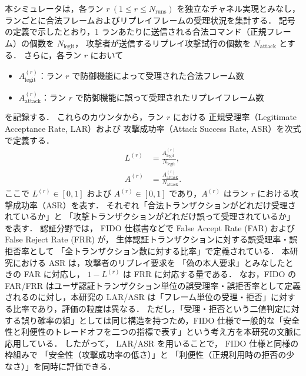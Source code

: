 \documentclass[twocolumn,10pt,a4paper]{jsarticle}
\begin{document}
本シミュレータは，各ラン $r \ (1 \le r \le N_{\mathrm{runs}})$ を独立なチャネル実現とみなし，
ランごとに合法フレームおよびリプレイフレームの受理状況を集計する．
記号の定義で示したとおり，1 ランあたりに送信される合法コマンド（正規フレーム）の個数を
$N_{\mathrm{legit}}$，
攻撃者が送信するリプレイ攻撃試行の個数を
$N_{\mathrm{attack}}$ とする．
さらに，各ラン $r$ において
\begin{itemize}
  \item $A^{(r)}_{\mathrm{legit}}$：ラン $r$ で防御機能によって受理された合法フレーム数
  \item $A^{(r)}_{\mathrm{attack}}$：ラン $r$ で防御機能に誤って受理されたリプレイフレーム数
\end{itemize}
を記録する．
これらのカウンタから，ラン $r$ における
正規受理率（Legitimate Acceptance Rate, LAR）および
攻撃成功率（Attack Success Rate, ASR）を次式で定義する．
\begin{align}
  L^{(r)} &= \frac{A^{(r)}_{\mathrm{legit}}}{N_{\mathrm{legit}}}, \label{eq:def_lar_single_run} \\
  A^{(r)} &= \frac{A^{(r)}_{\mathrm{attack}}}{N_{\mathrm{attack}}}. \label{eq:def_asr_single_run}
\end{align}
ここで $L^{(r)} \in [0,1]$ および $A^{(r)} \in [0,1]$ であり，$A^{(r)}$ はラン $r$ における攻撃成功率（ASR）を表す．
それぞれ「合法トランザクションがどれだけ受理されているか」と
「攻撃トランザクションがどれだけ誤って受理されているか」を表す．
認証分野では，
FIDO 仕様書などで False Accept Rate (FAR) および
False Reject Rate (FRR) が，
生体認証トランザクションに対する誤受理率・誤拒否率として
「全トランザクション数に対する比率」で定義されている\cite{FIDO}．
本研究における ASR は，攻撃者のリプレイ要求を
「偽の本人要求」とみなしたときの FAR に対応し，
$1 - L^{(r)}$ は FRR に対応する量である．
なお，FIDO の FAR/FRR はユーザ認証トランザクション単位の誤受理率・誤拒否率として定義されるのに対し，本研究の LAR/ASR は「フレーム単位の受理・拒否」に対する比率であり，評価の粒度は異なる．
ただし，「受理・拒否という二値判定に対する誤り確率の組」としては同じ構造を持つため，FIDO 仕様で一般的な「安全性と利便性のトレードオフを二つの指標で表す」という考え方を本研究の文脈に応用している．
したがって，
LAR/ASR を用いることで，
FIDO 仕様と同様の枠組みで
「安全性（攻撃成功率の低さ）」と
「利便性（正規利用時の拒否の少なさ）」を同時に評価できる．
\end{document}
